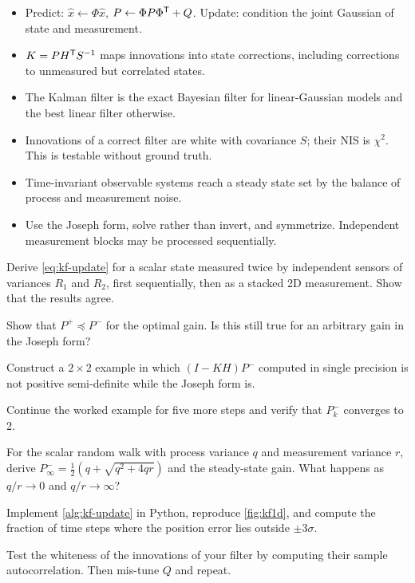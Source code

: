 \begin{takeaways}
\begin{itemize}
  \item Predict: $\hat x \gets \Phi\hat x$, $P \gets \Phi P\Phi^{\mathsf{T}} + Q$. Update: condition the joint Gaussian of state and measurement.
  \item $K = PH^{\mathsf{T}} S^{-1}$ maps innovations into state corrections, including corrections to unmeasured but correlated states.
  \item The Kalman filter is the exact Bayesian filter for linear-Gaussian models and the best linear filter otherwise.
  \item Innovations of a correct filter are white with covariance $S$; their NIS is $\chi^2$. This is testable without ground truth.
  \item Time-invariant observable systems reach a steady state set by the balance of process and measurement noise.
  \item Use the Joseph form, solve rather than invert, and symmetrize. Independent measurement blocks may be processed sequentially.
\end{itemize}
\end{takeaways}

\begin{exercises}
  \item Derive \eqref{eq:kf-update} for a scalar state measured twice by independent sensors of variances $R_1$ and $R_2$, first sequentially, then as a
        stacked 2D measurement. Show that the results agree.
  \item Show that $P^+ \preceq P^-$ for the optimal gain. Is this still true for an arbitrary gain in the Joseph form?
  \item Construct a $2\times2$ example in which $(I - KH)P^-$ computed in single precision is not positive semi-definite while the Joseph form is.
  \item Continue the worked example for five more steps and verify that $P_k^-$ converges to 2.
  \item For the scalar random walk with process variance $q$ and measurement variance $r$, derive $P^-_\infty = \tfrac12(q + \sqrt{q^2 + 4qr})$ and the
        steady-state gain. What happens as $q/r \to 0$ and $q/r \to \infty$?
  \item Implement \cref{alg:kf-update} in Python, reproduce \cref{fig:kf1d}, and compute the fraction of time steps where the position error lies outside
        $\pm3\sigma$.
  \item Test the whiteness of the innovations of your filter by computing their sample autocorrelation. Then mis-tune $Q$ and repeat.
\end{exercises}

